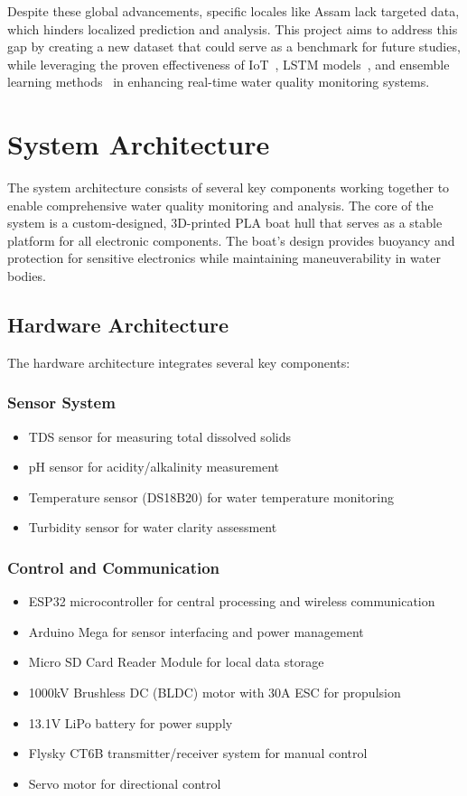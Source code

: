 \documentclass[conference]{IEEEtran}
\begin{document}
Despite these global advancements, specific locales like Assam lack targeted data, which hinders localized prediction and analysis. This project aims to address this gap by creating a new dataset that could serve as a benchmark for future studies, while leveraging the proven effectiveness of IoT~\cite{b2}, LSTM models~\cite{b1,b6}, and ensemble learning methods~\cite{b4,b5} in enhancing real-time water quality monitoring systems.

\section{System Architecture}
The system architecture consists of several key components working together to enable comprehensive water quality monitoring and analysis. The core of the system is a custom-designed, 3D-printed PLA boat hull that serves as a stable platform for all electronic components. The boat's design provides buoyancy and protection for sensitive electronics while maintaining maneuverability in water bodies.

\subsection{Hardware Architecture}
The hardware architecture integrates several key components:

\subsubsection{Sensor System}
\begin{itemize}
\item TDS sensor for measuring total dissolved solids
\item pH sensor for acidity/alkalinity measurement
\item Temperature sensor (DS18B20) for water temperature monitoring
\item Turbidity sensor for water clarity assessment
\end{itemize}

\subsubsection{Control and Communication}
\begin{itemize}
\item ESP32 microcontroller for central processing and wireless communication
\item Arduino Mega for sensor interfacing and power management
\item Micro SD Card Reader Module for local data storage
\item 1000kV Brushless DC (BLDC) motor with 30A ESC for propulsion
\item 13.1V LiPo battery for power supply
\item Flysky CT6B transmitter/receiver system for manual control
\item Servo motor for directional control
\end{itemize}
\end{document}
